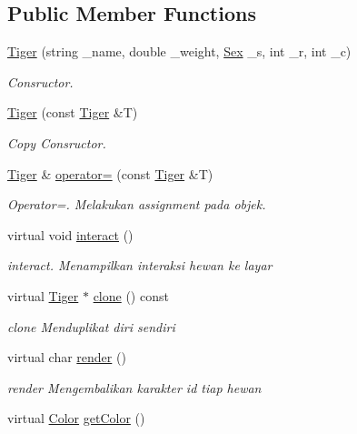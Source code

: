 \subsection*{Public Member Functions}
\begin{DoxyCompactItemize}
\item 
\hyperlink{classTiger_a226f75b71d3779e1257b822266d553a8}{Tiger} (string \+\_\+name, double \+\_\+weight, \hyperlink{sex_8h_a2633cb393c68bb2ee8080db58fb7ba93}{Sex} \+\_\+s, int \+\_\+r, int \+\_\+c)
\begin{DoxyCompactList}\small\item\em Consructor. \end{DoxyCompactList}\item 
\hyperlink{classTiger_a312f6ba4e6af4866e7891660b6b799a9}{Tiger} (const \hyperlink{classTiger}{Tiger} \&T)
\begin{DoxyCompactList}\small\item\em Copy Consructor. \end{DoxyCompactList}\item 
\hyperlink{classTiger}{Tiger} \& \hyperlink{classTiger_a24238e503c28e123a3fb7b273b828557}{operator=} (const \hyperlink{classTiger}{Tiger} \&T)
\begin{DoxyCompactList}\small\item\em Operator=. Melakukan assignment pada objek. \end{DoxyCompactList}\item 
virtual void \hyperlink{classTiger_ac1b9958a8e7c05090bf7283627d37745}{interact} ()
\begin{DoxyCompactList}\small\item\em interact. Menampilkan interaksi hewan ke layar \end{DoxyCompactList}\item 
virtual \hyperlink{classTiger}{Tiger} $\ast$ \hyperlink{classTiger_a9c253adc25d2ecf06da155a402e5437c}{clone} () const 
\begin{DoxyCompactList}\small\item\em clone Menduplikat diri sendiri \end{DoxyCompactList}\item 
virtual char \hyperlink{classTiger_a8896e2f02f31532632f3681a8dedb0ea}{render} ()
\begin{DoxyCompactList}\small\item\em render Mengembalikan karakter id tiap hewan \end{DoxyCompactList}\item 
virtual \hyperlink{color_8h_ab87bacfdad76e61b9412d7124be44c1c}{Color} \hyperlink{classTiger_ac1a32c141c442b257ed0898462ca0b2b}{get\+Color} ()

\end{DoxyCompactItemize}
